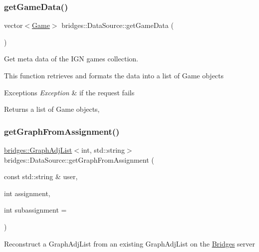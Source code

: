 \subsubsection{\texorpdfstring{getGameData()}{getGameData()}}
{\footnotesize\ttfamily vector$<$\mbox{\hyperlink{classbridges_1_1dataset_1_1_game}{Game}}$>$ bridges\+::\+Data\+Source\+::get\+Game\+Data (\begin{DoxyParamCaption}{ }\end{DoxyParamCaption})\hspace{0.3cm}{\ttfamily [inline]}}

Get meta data of the I\+GN games collection.

This function retrieves and formats the data into a list of Game objects


\begin{DoxyExceptions}{Exceptions}
{\em Exception} & if the request fails\\
\hline
\end{DoxyExceptions}
\begin{DoxyReturn}{Returns}
a list of Game objects, 
\end{DoxyReturn}
\mbox{\label{classbridges_1_1_data_source_ac4edf55c163c60f17b13f5499e5d2e65}} 
\subsubsection{\texorpdfstring{getGraphFromAssignment()}{getGraphFromAssignment()}}
{\footnotesize\ttfamily \mbox{\hyperlink{classbridges_1_1datastructure_1_1_graph_adj_list}{bridges\+::\+Graph\+Adj\+List}}$<$int, std\+::string$>$ bridges\+::\+Data\+Source\+::get\+Graph\+From\+Assignment (\begin{DoxyParamCaption}\item[{const std\+::string \&}]{user,  }\item[{int}]{assignment,  }\item[{int}]{subassignment = {} }\end{DoxyParamCaption})\hspace{0.3cm}{\ttfamily [inline]}}

Reconstruct a Graph\+Adj\+List from an existing Graph\+Adj\+List on the \mbox{\hyperlink{classbridges_1_1_bridges}{Bridges}} server

